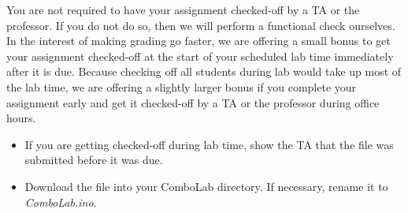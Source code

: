 You are not required to have your assignment checked-off by a TA or the
professor. If you do not do so, then we will perform a functional check
ourselves. In the interest of making grading go faster, we are offering a small
bonus to get your assignment checked-off at the start of your scheduled lab
time immediately after it is due. Because checking off all students during lab
would take up most of the lab time, we are offering a slightly larger bonus if
you complete your assignment early and get it checked-off by a TA or the
professor during office hours.

\begin{description}
    \begin{itemize}
    \item If you are getting checked-off during lab time, show the TA that the
        file was submitted before it was due.
    \item Download the file into your ComboLab directory. If necessary,
        rename it to \textit{ComboLab.ino}.
    \end{itemize}
\end{description}

